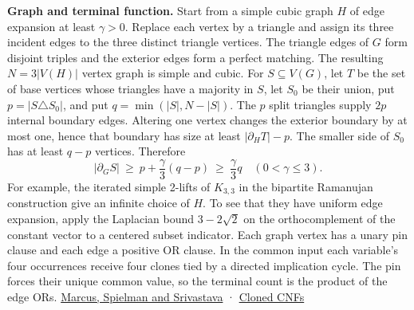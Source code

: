 \documentclass[
  11pt,
]{article}
\begin{document}
\textbf{Graph and terminal function.} Start from a simple cubic graph
\(H\) of edge expansion at least \(\gamma>0\). Replace each vertex by a
triangle and assign its three incident edges to the three distinct
triangle vertices. The triangle edges of \(G\) form disjoint triples and
the exterior edges form a perfect matching. The resulting \(N=3|V(H)|\)
vertex graph is simple and cubic. For \(S\subseteq V(G)\), let \(T\) be
the set of base vertices whose triangles have a majority in \(S\), let
\(S_0\) be their union, put \(p=|S\triangle S_0|\), and put
\(q=\min(|S|,N-|S|)\). The \(p\) split triangles supply \(2p\) internal
boundary edges. Altering one vertex changes the exterior boundary by at
most one, hence that boundary has size at least \(|\partial_H T|-p\).
The smaller side of \(S_0\) has at least \(q-p\) vertices. Therefore \[
 |\partial_G S|\ \ge\ p+\frac{\gamma}{3}(q-p)\ \ge\ \frac{\gamma}{3}q
 \quad (0<\gamma\le 3).
\] For example, the iterated simple 2-lifts of \(K_{3,3}\) in the
bipartite Ramanujan construction give an infinite choice of \(H\). To
see that they have uniform edge expansion, apply the Laplacian bound
\(3-2\sqrt2\) on the orthocomplement of the constant vector to a
centered subset indicator. Each graph vertex has a unary pin clause and
each edge a positive OR clause. In the common input each variable's four
occurrences receive four clones tied by a directed implication cycle.
The pin forces their unique common value, so the terminal count is the
product of the edge ORs.
\href{https://annals.math.princeton.edu/2015/182-1/p07}{Marcus, Spielman
and Srivastava} · \href{https://github.com/dch-and-Elara/some-research-inspired-by-openais-eth-preprint/tree/main/rank-budget-barriers}{Cloned CNFs}
\end{document}
